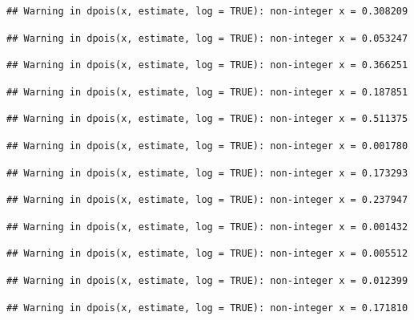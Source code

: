 \documentclass[]{article}
\begin{document}
\begin{verbatim}
## Warning in dpois(x, estimate, log = TRUE): non-integer x = 0.308209
\end{verbatim}

\begin{verbatim}
## Warning in dpois(x, estimate, log = TRUE): non-integer x = 0.053247
\end{verbatim}

\begin{verbatim}
## Warning in dpois(x, estimate, log = TRUE): non-integer x = 0.366251
\end{verbatim}

\begin{verbatim}
## Warning in dpois(x, estimate, log = TRUE): non-integer x = 0.187851
\end{verbatim}

\begin{verbatim}
## Warning in dpois(x, estimate, log = TRUE): non-integer x = 0.511375
\end{verbatim}

\begin{verbatim}
## Warning in dpois(x, estimate, log = TRUE): non-integer x = 0.001780
\end{verbatim}

\begin{verbatim}
## Warning in dpois(x, estimate, log = TRUE): non-integer x = 0.173293
\end{verbatim}

\begin{verbatim}
## Warning in dpois(x, estimate, log = TRUE): non-integer x = 0.237947
\end{verbatim}

\begin{verbatim}
## Warning in dpois(x, estimate, log = TRUE): non-integer x = 0.001432
\end{verbatim}

\begin{verbatim}
## Warning in dpois(x, estimate, log = TRUE): non-integer x = 0.005512
\end{verbatim}

\begin{verbatim}
## Warning in dpois(x, estimate, log = TRUE): non-integer x = 0.012399
\end{verbatim}

\begin{verbatim}
## Warning in dpois(x, estimate, log = TRUE): non-integer x = 0.171810
\end{verbatim}
\end{document}
